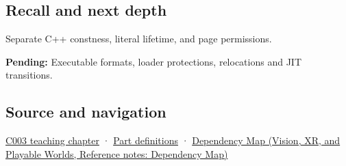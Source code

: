\subsection{Recall and next depth}\label{appendix-5f9e5e2f0a5e-recall-and-next-depth}

Separate C++ constness, literal lifetime, and page permissions.

\textbf{Pending:} Executable formats, loader protections, relocations and JIT transitions.

\subsection{Source and navigation}\label{appendix-5f9e5e2f0a5e-source-and-navigation}

\hyperref[01-foundations-i-ch002-where-the-bytes-live]{C003 teaching chapter} · \hyperref[appendix-fd090d982a15-m003---parts-41-60]{Part definitions} · \href{../07-Vision-XR-and-Playable-Worlds/main.pdf\#nameddest=appendix-4ad47bdd269a}{Dependency Map (Vision, XR, and Playable Worlds, Reference notes: Dependency Map)}

